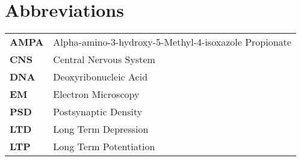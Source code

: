 
\section*{Abbreviations}

\begin{tabular}{ >{\bfseries}l l }
	AMPA     &  Alpha-amino-3-hydroxy-5-Methyl-4-isoxazole Propionate \\
	CNS	 &  Central Nervous System \\
	DNA 	 &  Deoxyribonucleic Acid \\
	EM 	 &  Electron Microscopy \\
	PSD 	 &  Postsynaptic Density \\
	LTD      &  Long Term Depression \\
	LTP      &  Long Term Potentiation \\
\end{tabular}
